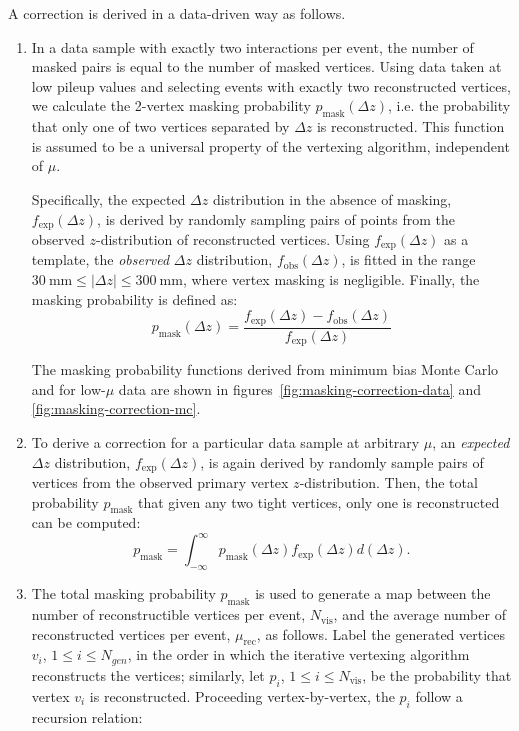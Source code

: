 A correction is derived in a data-driven way as follows. 
\begin{enumerate}
	\item In a data sample with exactly two interactions per event, the number of masked pairs is equal to the number of masked vertices. Using data taken at low pileup values and selecting events with exactly two reconstructed vertices, we calculate the 2-vertex masking probability $p_{\textrm{mask}}(\Delta z)$, i.e. the probability that only one of two vertices separated by $\Delta z$ is reconstructed. This function is assumed to be a universal property of the vertexing algorithm, independent of $\mu$. 
	
	Specifically, the expected $\Delta z$ distribution in the absence of masking, $f_{\mathrm{exp}}(\Delta z)$, is derived by randomly sampling pairs of points from the observed $z$-distribution of reconstructed vertices. Using $f_{\mathrm{exp}}(\Delta z)$ as a template, the \emph{observed} $\Delta z$ distribution, $f_{\mathrm{obs}}(\Delta z)$, is fitted in the range $\SI{30}{\milli\meter}\leq|\Delta z| \leq \SI{300}{\milli\meter}$, where vertex masking is negligible. Finally, the masking probability is defined as:
	\begin{equation}
		p_{\textrm{mask}}(\Delta z) = \frac{f_{\mathrm{exp}}(\Delta z) - f_{\mathrm{obs}}(\Delta z)}{f_{\mathrm{exp}}(\Delta z)}
	\end{equation}
	
	The masking probability functions derived from minimum bias Monte Carlo and for low-$\mu$ data are shown in figures~\ref{fig:masking-correction-data} and \ref{fig:masking-correction-mc}.
		
	\item To derive a correction for a particular data sample at arbitrary $\mu$, an \emph{expected} $\Delta z$ distribution, $f_{\mathrm{exp}}(\Delta z)$, is again derived by randomly sample pairs of vertices from the observed primary vertex $z$-distribution. Then, the total probability $p_{\textrm{mask}}$ that given any two tight vertices, only one is reconstructed can be computed: 
	\begin{equation}
		p_{\textrm{mask}} = \int_{-\infty}^{\infty} p_{\textrm{mask}}(\Delta z) f_{\mathrm{exp}}(\Delta z) d(\Delta z).
	\end{equation}
	
	\item The total masking probability $p_{\textrm{mask}}$ is used to generate a map between the number of reconstructible vertices per event, $N_{\textrm{vis}}$, and the average number of reconstructed vertices per event, $\mu_{\textrm{rec}}$, as follows. Label the generated vertices $v_i$, $1 \leq i \leq N_{gen}$, in the order in which the iterative vertexing algorithm reconstructs the vertices; similarly, let $p_i$, $1\leq i \leq N_{\textrm{vis}}$, be the probability that vertex $v_i$ is reconstructed. Proceeding vertex-by-vertex, the $p_i$ follow a recursion relation:


\end{enumerate}
